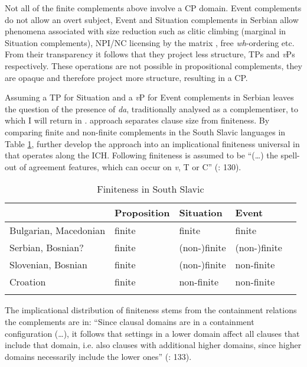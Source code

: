 \documentclass[output=paper]{langscibook}
\begin{document}
Not all of the finite complements above involve a CP domain. Event complements do not allow an overt subject, Event and Situation complements in Serbian allow phenomena associated with size reduction such as clitic climbing (marginal in Situation complements), NPI/NC licensing by the matrix , free \emph{wh}-ordering etc. From their transparency it follows that they project less structure, TPs and \emph{v}Ps respectively. These operations are not possible in propositional complements, they are opaque and therefore project more structure, resulting in a CP. 

Assuming a TP for Situation and a \emph{v}P for Event complements in Serbian leaves the question of the presence of \emph{da}, traditionally analysed as a complementiser, to which I will return in .
 approach separates clause size from finiteness. By comparing finite and non-finite complements in the South Slavic languages in Table \ref{Pajtab4}, \citet{wurmbrandetal2020} further develop the approach into an implicational finiteness universal in  that operates along the ICH. Following \citet{adger2007} finiteness is assumed to be “(…) the spell-out of agreement features, which can occur on \emph{v}, T or C” (\citealt{wurmbrandetal2020}: 130).

\begin{table}
\caption{Finiteness in South Slavic \citep[126]{wurmbrandetal2020}}
\label{Pajtab4}
 \begin{tabular}{l llll}
  \lsptoprule
            & Proposition & Situation  & Event \\
  \midrule
  Bulgarian, Macedonian  &  finite &   finite  &   finite    \\
  Serbian, Bosnian? & finite  & (non-)finite  & (non-)finite\\
  Slovenian, Bosnian & finite & (non-)finite  &    non-finite    \\
  Croation &   finite &   non-finite  &    non-finite     \\
  \lspbottomrule
 \end{tabular}
\end{table}


The implicational distribution of finiteness stems from the containment relations the complements are in: “Since clausal domains are in a containment configuration (…), it follows that settings in a lower domain affect all clauses that include that domain, i.e. also clauses with additional higher domains, since higher domains necessarily include the lower ones'' (\citealt{wurmbrandetal2020}: 133). 
\end{document}
